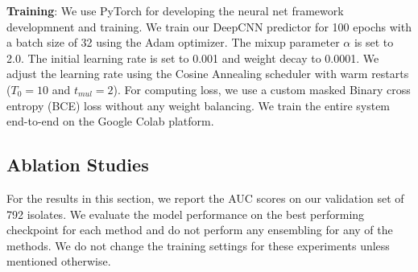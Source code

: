 \documentclass{article}
\begin{document}
\textbf{Training}: We use PyTorch \cite{paszke2019pytorch} for developing the neural net
framework developmnent and training. We train our DeepCNN predictor for 100 epochs with a batch size of 32
using the Adam optimizer. The mixup parameter $\alpha$ is set to 2.0. The initial
learning rate is set to 0.001 and weight decay to 0.0001. We adjust the learning rate using the Cosine Annealing
scheduler with warm restarts \cite{loshchilov2017sgdr} ($T_0 = 10$ and $t_{mul}=2$). For computing loss, we use a custom masked
Binary cross entropy (BCE) loss without any weight balancing. We train the entire system end-to-end 
on the Google Colab platform.

\subsection{Ablation Studies}
For the results in this section, we report the AUC scores on our validation set of 792 isolates.
We evaluate the model performance on the best performing checkpoint for each method and do
not perform any ensembling for any of the methods. We do not change the training settings for these
experiments unless mentioned otherwise.
\end{document}
